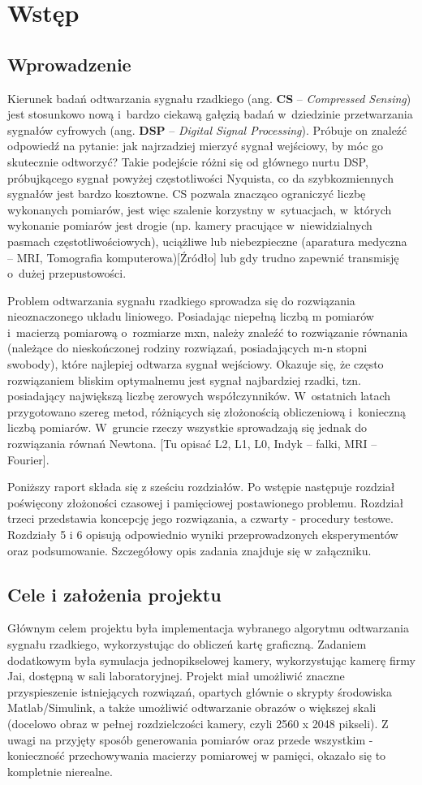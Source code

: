 \section{Wstęp}
\subsection{Wprowadzenie}
Kierunek badań odtwarzania sygnału rzadkiego (ang. \textbf{CS} – \textit{Compressed Sensing}) jest stosunkowo nową i bardzo ciekawą gałęzią badań w~dziedzinie przetwarzania sygnałów cyfrowych (ang. \textbf{DSP} – \textit{Digital Signal Processing}). Próbuje on znaleźć odpowiedź na pytanie: jak najrzadziej mierzyć sygnał wejściowy, by móc go skutecznie odtworzyć? Takie podejście różni się od głównego nurtu DSP, próbujkącego sygnał powyżej częstotliwości Nyquista, co da szybkozmiennych sygnałów jest bardzo kosztowne. CS pozwala znacząco ograniczyć liczbę wykonanych pomiarów, jest więc szalenie korzystny  w~sytuacjach, w~których wykonanie pomiarów jest drogie (np. kamery pracujące w niewidzialnych pasmach częstotliwościowych), uciążliwe lub niebezpieczne (aparatura medyczna – MRI, Tomografia komputerowa)[Źródło] lub gdy trudno zapewnić transmisję o~dużej przepustowości. 

Problem odtwarzania sygnału rzadkiego sprowadza się do rozwiązania nieoznaczonego układu liniowego. Posiadając niepełną liczbą m pomiarów i~macierzą pomiarową o~rozmiarze mxn, należy znaleźć to rozwiązanie równania (należące do nieskończonej rodziny rozwiązań, posiadających m-n stopni swobody), które najlepiej odtwarza sygnał wejściowy. Okazuje się, że często rozwiązaniem bliskim optymalnemu jest sygnał najbardziej rzadki, tzn. posiadający największą liczbę zerowych współczynników. W~ostatnich latach przygotowano szereg metod, różniących się złożonością obliczeniową i~konieczną liczbą pomiarów. W~gruncie rzeczy wszystkie sprowadzają się jednak do rozwiązania równań Newtona.  [Tu opisać L2, L1, L0, Indyk – falki, MRI – Fourier].

Poniższy raport składa się z sześciu rozdziałów. Po wstępie następuje rozdział poświęcony złożoności czasowej i pamięciowej postawionego problemu. Rozdział trzeci przedstawia koncepcję jego rozwiązania, a czwarty - procedury testowe. Rozdziały 5 i 6 opisują odpowiednio wyniki przeprowadzonych eksperymentów oraz podsumowanie. Szczegółowy opis zadania znajduje się w załączniku.
\subsection{Cele i założenia projektu}
Głównym celem projektu była implementacja wybranego algorytmu odtwarzania sygnału rzadkiego, wykorzystując do obliczeń kartę graficzną. Zadaniem dodatkowym była symulacja jednopikselowej kamery, wykorzystując kamerę firmy Jai, dostępną w sali laboratoryjnej. Projekt miał umożliwić znaczne przyspieszenie istniejących rozwiązań, opartych głównie o skrypty środowiska Matlab/Simulink, a także umożliwić odtwarzanie obrazów o większej skali (docelowo obraz w pełnej rozdzielczości kamery, czyli 2560 x 2048 pikseli). Z uwagi na przyjęty sposób generowania pomiarów oraz przede wszystkim - konieczność przechowywania macierzy pomiarowej w pamięci, okazało się to kompletnie nierealne.
